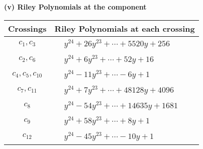 \documentclass[1p]{elsarticle_modified}
\theoremstyle{definition}
\begin{document}
\flushleft \textbf{(v) Riley Polynomials at the component}\newline \\
\begin{tabular}{m{50pt}|m{274pt}}
Crossings & \hspace{64pt}Riley Polynomials at each crossing \\
\hline $$\begin{aligned}c_{1},c_{3}\end{aligned}$$&$\begin{aligned}
&y^{24}+26 y^{23}+\cdots+5520 y+256
\end{aligned}$\\
\hline $$\begin{aligned}c_{2},c_{6}\end{aligned}$$&$\begin{aligned}
&y^{24}+6 y^{23}+\cdots+52 y+16
\end{aligned}$\\
\hline $$\begin{aligned}c_{4},c_{5},c_{10}\end{aligned}$$&$\begin{aligned}
&y^{24}-11 y^{23}+\cdots-6 y+1
\end{aligned}$\\
\hline $$\begin{aligned}c_{7},c_{11}\end{aligned}$$&$\begin{aligned}
&y^{24}+7 y^{23}+\cdots+48128 y+4096
\end{aligned}$\\
\hline $$\begin{aligned}c_{8}\end{aligned}$$&$\begin{aligned}
&y^{24}-54 y^{23}+\cdots+14635 y+1681
\end{aligned}$\\
\hline $$\begin{aligned}c_{9}\end{aligned}$$&$\begin{aligned}
&y^{24}+58 y^{23}+\cdots+8 y+1
\end{aligned}$\\
\hline $$\begin{aligned}c_{12}\end{aligned}$$&$\begin{aligned}
&y^{24}-45 y^{23}+\cdots-10 y+1
\end{aligned}$\\
\hline
\end{tabular}\\~\\
\end{document}
